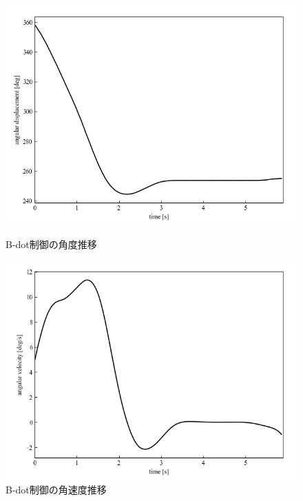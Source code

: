 \begin{figure}[h]
	\centering
	\begin{minipage}{0.43\columnwidth}
	  \centering
	  \includegraphics[width=\columnwidth]{./figure/kb5deg.png}
	  \caption{B-dot制御の角度推移}
	  \label{fig:kb5deg}
	\end{minipage}
	\hspace{5mm}
	\begin{minipage}{0.43\columnwidth}
	  \centering
	  \includegraphics[width=\columnwidth]{./figure/kb5degpers.png}
	  \caption{B-dot制御の角速度推移}
	  \label{fig:kb5degpers}
	\end{minipage}
\end{figure}

